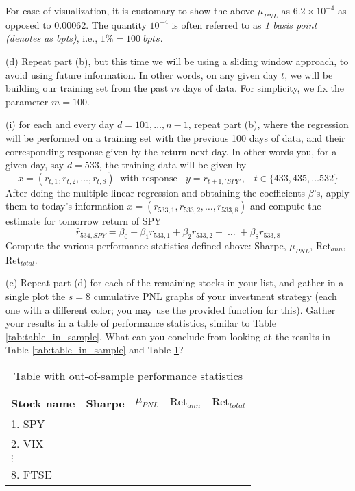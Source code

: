 \documentclass[12pt]{article}
\begin{document}
For ease of visualization, it is customary to show the above $\mu_{PNL}$ as $6.2 \times 10^{-4}$ as opposed to $0.00062$. The quantity $10^{-4}$ is often referred to as \textit{1 basis point (denotes as bpts)}, i.e., $1\% = 100 \; bpts$.

(d)  Repeat part (b), but this time we will be using a sliding window approach, to avoid using future information. In other words, on any given day $t$, we will be building our training set from the past $m$ days of data. For simplicity, we fix the parameter $m=100$.

(i) for each and every day $d = 101, \ldots,n-1$, repeat part (b), where the regression will be performed on a training set with the previous 100 days of data, and their corresponding response given by the return next day. In other words you, for a given day, say 
$d=533$, the training data will be given by 
$$ x = (r_{t,1}, r_{t,2}, \ldots,  r_{t,8})  \;\; \mbox{with response }  \;\;y = r_{t+1,'SPY'}, \;\;\; t \in \{433, 435, \ldots 532\} $$
After doing the multiple linear regression and obtaining the coefficients $\beta$'s, apply them to today's information 
$ x = (r_{533,1}, r_{533,2}, \ldots,  r_{533,8})  $ 
and compute the estimate for tomorrow return of SPY
$$  \hat{r}_{534,SPY} = \beta_0 + \beta_1 r_{533,1} +  \beta_2 r_{533,2} + \; \ldots \;  + \beta_8 r_{533,8} $$
Compute the various performance statistics defined above: Sharpe, $\mu_{PNL}$, $\mbox{Ret}_{ann} $, $\mbox{Ret}_{total}$.

(e) Repeat part (d) for each of the remaining stocks in your list, and gather in a single plot the $s=8$ cumulative PNL graphs of your investment strategy (each one with a different color; you may use the provided function for this).
% 
 Gather your results in a table of performance statistics, similar to  Table \ref{tab:table_in_sample}. What can you conclude from looking at the results in Table \ref{tab:table_in_sample} and Table \ref{tab:table_out_of_sample}?
%
\begin{table}[h!]
\begin{minipage}[b]{0.99\linewidth}
\centering
\begin{tabular}{ |l|l|l|l|l| }
\hline
Stock name & Sharpe & $\mu_{PNL}$ & $\mbox{Ret}_{ann} $ & $\mbox{Ret}_{total} $ \\ 
  \hline
1. SPY  &     &    &    &     \\  \hline
2. VIX  &     & & &   \\        \hline
$\vdots$  &     & & &   \\        \hline
8. FTSE  &     & & &   \\        \hline
\end{tabular}
\caption{Table with out-of-sample performance statistics}
\label{tab:table_out_of_sample}
\end{minipage}
\end{table}
\end{document}
